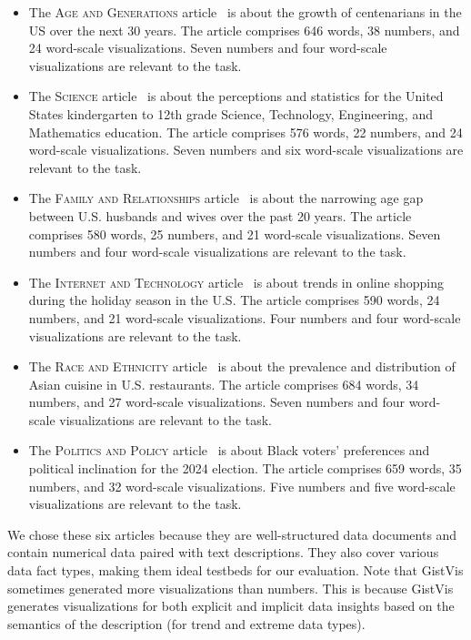 \begin{itemize}
    \item The \textsc{Age and Generations} article~\cite{us-centenarian} is about the growth of centenarians in the US over the next 30 years. The article comprises 646 words, 38 numbers, and 24 word-scale visualizations. Seven numbers and four word-scale visualizations are relevant to the task. 
    \item The \textsc{Science} article~\cite{us-k12-education} is about the perceptions and statistics for the United States kindergarten to 12th grade Science, Technology, Engineering, and Mathematics education. The article comprises 576 words, 22 numbers, and 24 word-scale visualizations. Seven numbers and six word-scale visualizations are relevant to the task. 
    \item The \textsc{Family and Relationships} article~\cite{age-of-us-couples} is about the narrowing age gap between U.S. husbands and wives over the past 20 years. The article comprises 580 words, 25 numbers, and 21 word-scale visualizations. Seven numbers and four word-scale visualizations are relevant to the task. 
    \item The \textsc{Internet and Technology} article~\cite{online-shopping-sales} is about trends in online shopping during the holiday season in the U.S. The article comprises 590 words, 24 numbers, and 21 word-scale visualizations. Four numbers and four word-scale visualizations are relevant to the task. 
    \item The \textsc{Race and Ethnicity} article~\cite{restaurants} is about the prevalence and distribution of Asian cuisine in U.S. restaurants. The article comprises 684 words, 34 numbers, and 27 word-scale visualizations. Seven numbers and four word-scale visualizations are relevant to the task. 
    \item The \textsc{Politics and Policy} article~\cite{black-voters-support} is about Black voters' preferences and political inclination for the 2024 election. The article comprises 659 words, 35 numbers, and 32 word-scale visualizations. Five numbers and five word-scale visualizations are relevant to the task. 
\end{itemize}

We chose these six articles because they are well-structured data documents and contain numerical data paired with text descriptions. They also cover various data fact types, making them ideal testbeds for our evaluation. Note that GistVis sometimes generated more visualizations than numbers. This is because GistVis generates visualizations for both explicit and implicit data insights based on the semantics of the description (for trend and extreme data types).


